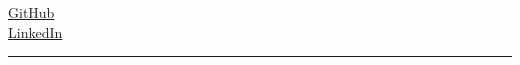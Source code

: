 \begin{center}
	\begin{minipage}[b]{.3\textwidth}
	\raggedright
	{\city} \\ %
	\href{mailto:\email}{\email} %
	\end{minipage}%
	\begin{minipage}[b]{.4\textwidth}
	\makeatletter
	\centering {\Huge \@author} \\
	\makeatother
    \vspace{.5em}
    {\color{highlight} \Large{\role}}
	\end{minipage}%
	\begin{minipage}[b]{.3\textwidth}
	\raggedleft 
	\href{https://github.com/\github}{GitHub} \\%
	\href{https://www.linkedin.com/in/jfkerman/}{LinkedIn} 
	\end{minipage}
	\vspace{-2mm}

{\color{highlight} \hrule}
\end{center}